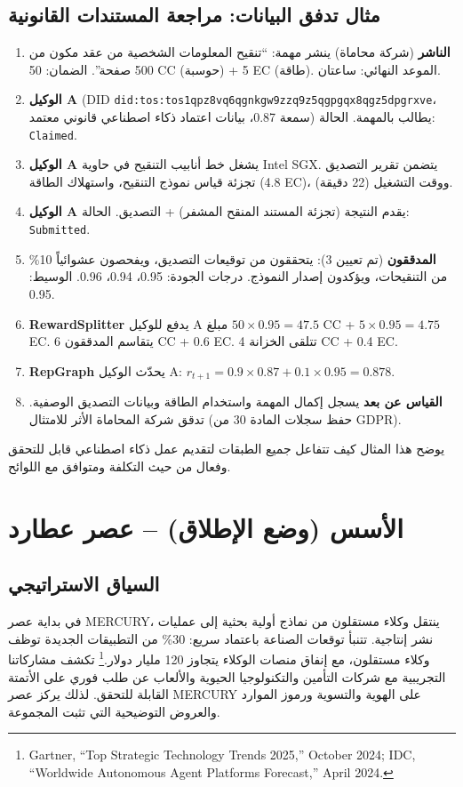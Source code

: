 \documentclass[11pt]{article}
\begin{document}
\subsection{مثال تدفق البيانات: مراجعة المستندات القانونية}
\begin{enumerate}[label=\arabic*.]
  \item \textbf{الناشر} (شركة محاماة) ينشر مهمة: ``تنقيح المعلومات الشخصية من عقد مكون من 500 صفحة''. الضمان: 50 CC (حوسبة) + 5 EC (طاقة). الموعد النهائي: ساعتان.
  \item \textbf{الوكيل A} (DID \texttt{did:tos:tos1qpz8vq6qgnkgw9zzq9z5qgpgqx8qgz5dpgrxve}، سمعة 0.87، بيانات اعتماد ذكاء اصطناعي قانوني معتمد) يطالب بالمهمة. الحالة: \texttt{Claimed}.
  \item \textbf{الوكيل A} يشغل خط أنابيب التنقيح في حاوية Intel SGX. يتضمن تقرير التصديق تجزئة قياس نموذج التنقيح، واستهلاك الطاقة (4.8 EC)، ووقت التشغيل (22 دقيقة).
  \item \textbf{الوكيل A} يقدم النتيجة (تجزئة المستند المنقح المشفر) + التصديق. الحالة: \texttt{Submitted}.
  \item \textbf{المدققون} (تم تعيين 3): يتحققون من توقيعات التصديق، ويفحصون عشوائياً 10\% من التنقيحات، ويؤكدون إصدار النموذج. درجات الجودة: 0.95، 0.94، 0.96. الوسيط: 0.95.
  \item \textbf{RewardSplitter} يدفع للوكيل A مبلغ $50 \times 0.95 = 47.5$ CC + $5 \times 0.95 = 4.75$ EC. يتقاسم المدققون 6 CC + 0.6 EC. تتلقى الخزانة 4 CC + 0.4 EC.
  \item \textbf{RepGraph} يحدّث الوكيل A: $r_{t+1} = 0.9 \times 0.87 + 0.1 \times 0.95 = 0.878$.
  \item \textbf{القياس عن بعد} يسجل إكمال المهمة واستخدام الطاقة وبيانات التصديق الوصفية. تدقق شركة المحاماة الأثر للامتثال (حفظ سجلات المادة 30 من GDPR).
\end{enumerate}

يوضح هذا المثال كيف تتفاعل جميع الطبقات لتقديم عمل ذكاء اصطناعي قابل للتحقق وفعال من حيث التكلفة ومتوافق مع اللوائح.

\section{الأسس (وضع الإطلاق) -- عصر عطارد}
\subsection{السياق الاستراتيجي}
في بداية عصر MERCURY، ينتقل وكلاء مستقلون من نماذج أولية بحثية إلى عمليات نشر إنتاجية. تتنبأ توقعات الصناعة باعتماد سريع: 30\% من التطبيقات الجديدة توظف وكلاء مستقلون، مع إنفاق منصات الوكلاء يتجاوز 120 مليار دولار.\footnote{Gartner, ``Top Strategic Technology Trends 2025,'' October 2024; IDC, ``Worldwide Autonomous Agent Platforms Forecast,'' April 2024.} تكشف مشاركاتنا التجريبية مع شركات التأمين والتكنولوجيا الحيوية والألعاب عن طلب فوري على الأتمتة القابلة للتحقق. لذلك يركز عصر MERCURY على الهوية والتسوية ورموز الموارد والعروض التوضيحية التي تثبت المجموعة.
\end{document}
